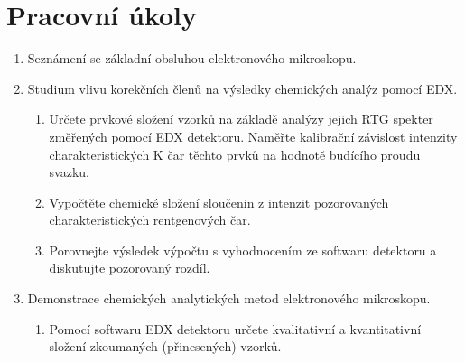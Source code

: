 \documentclass[a4paper]{article}
\author{Vladislav Wohlrath}
\begin{document}
\begin{titlepage}

\end{titlepage}

\section*{Pracovní úkoly}
\begin{enumerate}
\item Seznámení se základní obsluhou elektronového mikroskopu.
\item Studium vlivu korekčních členů na výsledky chemických analýz pomocí EDX.
\begin{enumerate}
\item Určete prvkové složení vzorků na základě analýzy jejich RTG spekter změřených pomocí EDX detektoru. Naměřte kalibrační závislost intenzity charakteristických K čar těchto prvků na hodnotě budícího proudu svazku.
\item Vypočtěte chemické složení sloučenin z intenzit pozorovaných charakteristických rentgenových čar.
\item Porovnejte výsledek výpočtu s vyhodnocením ze softwaru detektoru a diskutujte pozorovaný rozdíl.
\end{enumerate}
\item Demonstrace chemických analytických metod elektronového mikroskopu.
\begin{enumerate}
\item Pomocí softwaru EDX detektoru určete kvalitativní a kvantitativní složení zkoumaných (přinesených) vzorků.
\end{enumerate}
\end{enumerate}












\printbibliography[title={Seznam použité literatury}]
\end{document}
